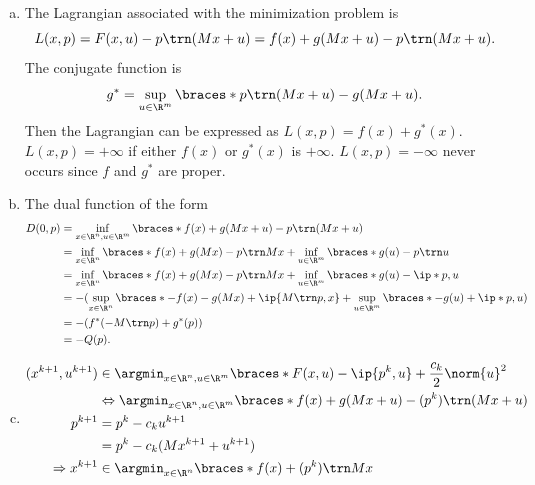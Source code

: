 \documentclass{article}
\theoremstyle{plain}
\theoremstyle{definition}
\theoremstyle{remark}
\begin{document}
\begin{solution}
\begin{enumerate}[(a)]
{\begin{proof}
                We can prove the proper function using prove by contradiction.  Suppose $F(x, u)=f(x)+g(Mx+u)=+\infty$ for all $(x, u)\in\R^n\times\R^m$. Since $f$ and $g$ are proper, there exist $x_0\in \R^n$ and $z_0\in\R^m$ such that $f(x_0)$ and $g(z_0)$ are finite. Let $u_0=z_0-Mx_0$, then $f(x_0)+g(Mx_0+u_0)=f(x_0)+g(z_0)$ is finite, which contradicts the assumption. Therefore, $F$ is proper.
            \end{proof}
        }
        \item The Lagrangian associated with the minimization problem is \[L(x, p) = F(x,u)-p\trn (Mx+u)=f(x)+g(Mx+u)-p\trn (Mx+u).\] The conjugate function is \[g^*=\sup_{u\in\R^m}\braces*{p\trn (Mx+u)-g(Mx+u)}.\] Then the Lagrangian can be expressed as $L(x, p) = f(x)+g^*(x)$. $L(x,p)=+\infty$  if either $f(x)$ or $g^*(x)$ is $+\infty$. $L(x,p)=-\infty$ never occurs since $f$ and $g^*$ are proper.
        \item {
            The dual function of the form
            \begin{align*}
                D(0,p)
                &= \inf_{x\in\R^n, u\in\R^m}\braces*{f(x)+g(Mx+u)-p\trn (Mx+u)} \\
                &= \inf_{x\in\R^n} \braces*{f(x)+g(Mx)-p\trn Mx}+\inf_{u\in\R^m}\braces*{g(u)-p\trn u} \\
                &= \inf_{x\in\R^n} \braces*{f(x)+g(Mx)-p\trn Mx}+\inf_{u\in\R^m}\braces*{g(u)-\ip*{p, u}} \\
                &= -(\sup_{x\in\R^n}\braces*{-f(x)-g(Mx)+\ip{M\trn p,x}}+\sup_{u\in\R^m}\braces*{-g(u)+\ip*{p, u}}) \\
                &= -(f^*(-M\trn p)+g^*(p)) \\
                &= -Q(p).
            \end{align*}
        }
        \item {
            \begin{align*}
                (x^{k+1}, u^{k+1}) &\in \argmin_{x\in\R^n, u\in\R^m}\braces*{F(x, u)-\ip{p^k, u}+\frac{c_k}{2}\norm{u}^2} \\
                &\Leftrightarrow \argmin_{x\in\R^n, u\in\R^m}\braces*{f(x)+g(Mx+u)-(p^k)\trn (Mx+u)} \\
                p^{k+1} &= p^k-c_ku^{k+1} \\
                &= p^k-c_k(Mx^{k+1}+u^{k+1}) \\
                \Rightarrow
                x^{k+1} &\in \argmin_{x\in\R^n}\braces*{f(x)+(p^k)\trn Mx} \\

\end{align*}}
\end{enumerate}
\end{solution}
\end{document}
